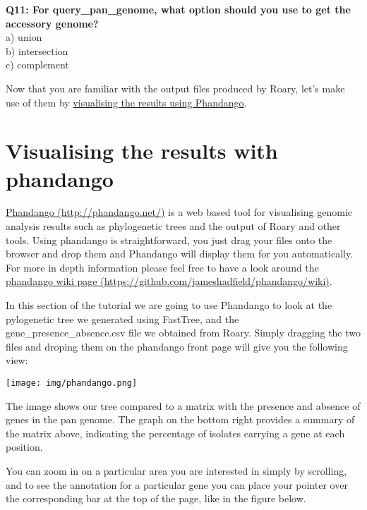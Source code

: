 \documentclass[11pt]{article}
\begin{document}
\textbf{Q11: For query\_pan\_genome, what option should you use to get
the accessory genome?}\\
a) union\\
b) intersection\\
c) complement

Now that you are familiar with the output files produced by Roary, let's
make use of them by \href{phandango.ipynb}{visualising the results using
Phandango}.





\newpage





    \hypertarget{visualising-the-results-with-phandango}{%
\section{Visualising the results with
phandango}\label{visualising-the-results-with-phandango}}

\href{http://phandango.net/}{Phandango (http://phandango.net/)} is a web
based tool for visualising genomic analysis results such as phylogenetic
trees and the output of Roary and other tools. Using phandango is
straightforward, you just drag your files onto the browser and drop them
and Phandango will display them for you automatically. For more in depth
information please feel free to have a look around the
\href{https://github.com/jameshadfield/phandango/wiki}{phandango wiki
page (https://github.com/jameshadfield/phandango/wiki)}.

In this section of the tutorial we are going to use Phandango to look at
the pylogenetic tree we generated using FastTree, and the
gene\_presence\_absence.csv file we obtained from Roary. Simply dragging
the two files and droping them on the phandango front page will give you
the following view:


\begin{center}
\texttt{[image: img/phandango.png]}
\end{center}


    The image shows our tree compared to a matrix with the presence and
absence of genes in the pan genome. The graph on the bottom right
provides a summary of the matrix above, indicating the percentage of
isolates carrying a gene at each position.

You can zoom in on a particular area you are interested in simply by
scrolling, and to see the annotation for a particular gene you can place
your pointer over the corresponding bar at the top of the page, like in
the figure below.
\end{document}
